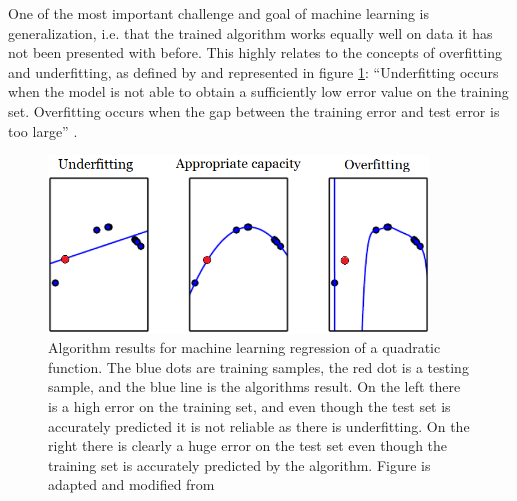 \documentclass[../main.tex]{subfiles}
\begin{document}
One of the most important challenge and goal of machine learning is generalization, i.e. that the trained algorithm works equally well on data it has not been presented with before. 
This highly relates to the concepts of overfitting and underfitting, as defined by \textcite{Goodfellow2016} and represented in figure \ref{fig:over-vs-under}: ``Underﬁtting occurs when the model is not able to obtain a suﬃciently low error value on the training set. Overﬁtting occurs when the gap between the training error and test error is too large'' \parencite[109]{Goodfellow2016}.
\begin{figure}[ht]
    \centering
    \includegraphics[width=0.9\textwidth]{img/overfitting-vs-underfitting}
    \caption{Algorithm results for machine learning regression of a quadratic function. The blue dots are training samples, the red dot is a testing sample, and the blue line is the algorithms result. On the left there is a high error on the training set, and even though the test set is accurately predicted it is not reliable as there is underfitting. On the right there is clearly a huge error on the test set even though the training set is accurately predicted by the algorithm. Figure is adapted and modified from \cite[Fig. 5.2]{Goodfellow2016}}
    \label{fig:over-vs-under}
\end{figure}
\end{document}
